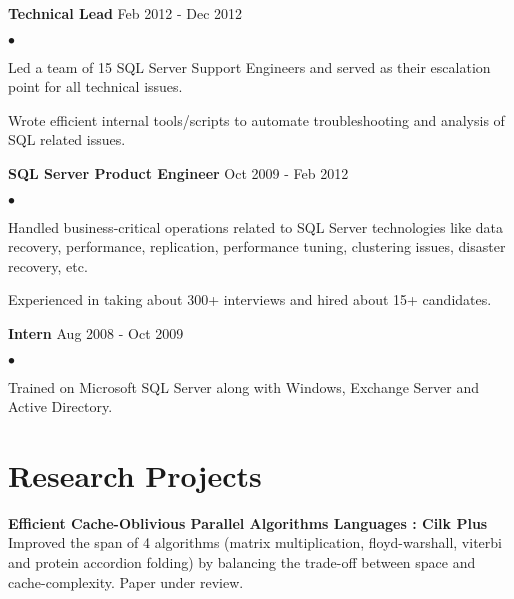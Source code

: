 \documentclass[margin,line,10.5pt]{res}
\newenvironment{list2}{
  \begin{list}{$\bullet$}{%
      \setlength{\itemsep}{0in}
      \setlength{\parsep}{0in} \setlength{\parskip}{0in}
      \setlength{\topsep}{0in} \setlength{\partopsep}{0in} 
      \setlength{\leftmargin}{0.2in}}}{\end{list}}
\begin{document}
\begin{resume}
{\bf Technical Lead\hspace{8.9cm}}   \hfill Feb 2012 - Dec 2012\\
\vspace{-.4cm}
\begin{list2}
\item Led a team of 15 SQL Server Support Engineers and served as their escalation point for all technical issues.
\item Wrote efficient internal tools/scripts to automate troubleshooting and analysis of SQL related issues.
\end{list2}
\vspace{-.2cm}
{\bf SQL Server Product Engineer \hspace{5.9cm}}  \hfill Oct 2009 - Feb 2012 \\
\vspace{-.4cm}
\begin{list2}
\item Handled business-critical operations related to SQL Server technologies like data recovery, performance, replication, performance tuning, clustering issues, disaster recovery, etc. 
\item Experienced in taking about 300+ interviews and hired about 15+ candidates.
\end{list2}
\vspace{-.2cm}
{\bf Intern \hspace{10.5cm}}   \hfill Aug 2008 - Oct 2009 
\vspace{-.4cm}
\begin{list2}
\item Trained on Microsoft SQL Server along with Windows, Exchange Server and Active Directory.
\end{list2}

\vspace{-.15cm}

\section{\sc Research Projects}

{\bf Efficient Cache-Oblivious Parallel Algorithms \hfill Languages : Cilk Plus}\\ 
Improved the span of 4 algorithms (matrix multiplication, floyd-warshall, viterbi and protein accordion folding) by balancing the trade-off between space and cache-complexity. Paper under review.

\vspace{-.15cm}


\end{resume}
\end{document}

